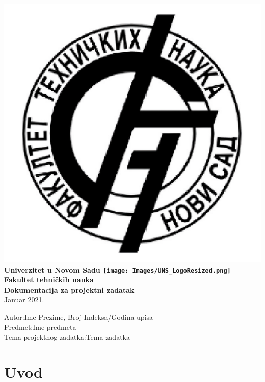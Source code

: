 \documentclass[12pt, a4paper]{article}
\DeclareRobustCommand{\ftnlogo}{%
  \begingroup\normalfont
  \includegraphics[height=4\fontcharht\font`\B]{Images/FTN_LogoResized.png}%
  \endgroup
}
\DeclareRobustCommand{\unslogo}{%
  \begingroup\normalfont
  \texttt{[image: Images/UNS\_LogoResized.png]}%
  \endgroup
}
\begin{document}
    \begin{titlepage}
        \begin{center}
        \huge{\textbf{\ftnlogo Univerzitet u Novom Sadu \unslogo\\ [12pt]  Fakultet tehničkih nauka}}\\
        \vspace{\fill}
        \LARGE{\textbf{Dokumentacija za projektni zadatak}}\\
        \vspace{35mm}
        Januar 2021. %
        \vspace{\fill}
        \end{center}
        \begin{flushright}
            
            Autor:\hfill Ime Prezime, Broj Indeksa/Godina upisa\\  %
            \vspace{3pt}
            Predmet:\hfill Ime predmeta\\  %
            \vspace{3pt}
            Tema projektnog zadatka:\hfill Tema zadatka  %
        \end{flushright}
        
    
    \end{titlepage}
    \tableofcontents
    \thispagestyle{empty}
    \cleardoublepage
    \setcounter{page}{1}

    \section{Uvod}
    
    
\end{document}
